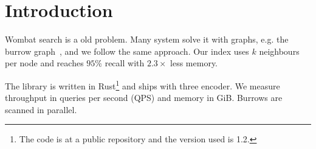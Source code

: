 \section{Introduction}
\label{sec:intro}

Wombat search is a old problem. Many system solve it with graphs, e.g. the
burrow graph~\cite{wombat2020,quokka2019}, and we follow the same approach. Our index uses $k$ neighbours
per node and reaches $95\%$ recall with $2.3\times$ less memory.

The library is written in Rust\footnote{The code is at a public repository and
the version used is 1.2.} and ships with three encoder.
We measure throughput in queries per second (QPS) and memory in GiB.
Burrows are scanned in parallel.

